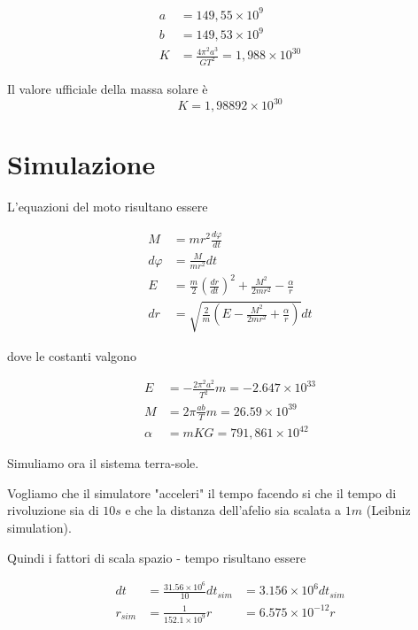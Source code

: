 \documentclass[a4paper,11pt]{article}
\begin{document}
\begin{align*}
	a & = 149,55 \times 10^9 \\
	b & = 149,53 \times 10^9 \\
	K & = \frac{4 \pi^2 a^3}{GT^2} = 1,988 \times 10^{30}
\end{align*}

Il valore ufficiale della massa solare è
\[
	K = 1,98892 \times 10^{30}
\]

\section{Simulazione}

L'equazioni del moto risultano essere

\begin{align*}
    M & = m r^2 \frac{d \varphi}{dt}  \\
    d \varphi & = \frac{M}{m r^2} dt \\
	E & = \frac{m}{2} \left( \frac{dr}{dt} \right) ^2 + \frac{M^2}{2 m r^2} - \frac{\alpha}{r}\\
	dr & = \sqrt{\frac{2}{m} \left( E - \frac{M^2}{2 m r^2} + \frac{\alpha}{r} \right) } dt
\end{align*}

dove le costanti valgono

\begin{align*}
	E & = - \frac{2 \pi^2 a^2}{T^2} m = -2.647 \times 10^{33} \\
	M & = 2 \pi \frac{ab}{T} m = 26.59 \times 10^{39} \\
	\alpha & = mKG = 791,861 \times 10^{42}
\end{align*}

Simuliamo ora il sistema terra-sole.

Vogliamo che il simulatore "acceleri" il tempo facendo si che il tempo di rivoluzione sia di $ 10 s $
e che la distanza dell'afelio sia scalata a $1 m$ (Leibniz simulation).

Quindi i fattori di scala spazio - tempo risultano essere

\begin{align*}
	dt & = \frac{31.56 \times 10^6}{10} dt_{sim} & = 3.156 \times 10^6 dt_{sim} \\
	r_{sim} & = \frac{1}{152.1 \times 10^9} r & = 6.575 \times 10^{-12} r
\end{align*}
\end{document}
